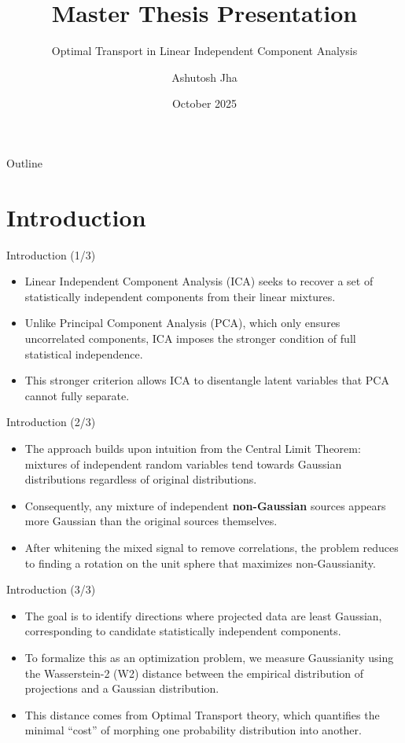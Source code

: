 \documentclass{beamer}
\title{Master Thesis Presentation}
\subtitle{Optimal Transport in Linear Independent Component Analysis}
\author{Ashutosh Jha}
\institute{University of Tuebingen}
\date{October 2025}
\begin{document}
\begin{frame}
  \titlepage
\end{frame}

\begin{frame}{Outline}
  \tableofcontents
\end{frame}

\section{Introduction}

\begin{frame}{Introduction (1/3)}
  \begin{itemize}
    \item Linear Independent Component Analysis (ICA) seeks to recover a set of statistically independent components from their linear mixtures.
    \item Unlike Principal Component Analysis (PCA), which only ensures uncorrelated components, ICA imposes the stronger condition of full statistical independence.
    \item This stronger criterion allows ICA to disentangle latent variables that PCA cannot fully separate.
  \end{itemize}
\end{frame}

\begin{frame}{Introduction (2/3)}
  \begin{itemize}
    \item The approach builds upon intuition from the Central Limit Theorem: mixtures of independent random variables tend towards Gaussian distributions regardless of original distributions.
    \item Consequently, any mixture of independent \textbf{non-Gaussian} sources appears more Gaussian than the original sources themselves.
    \item After whitening the mixed signal to remove correlations, the problem reduces to finding a rotation on the unit sphere that maximizes non-Gaussianity.
  \end{itemize}
\end{frame}

\begin{frame}{Introduction (3/3)}
  \begin{itemize}
    \item The goal is to identify directions where projected data are least Gaussian, corresponding to candidate statistically independent components.
    \item To formalize this as an optimization problem, we measure Gaussianity using the Wasserstein-2 (W2) distance between the empirical distribution of projections and a Gaussian distribution.
    \item This distance comes from Optimal Transport theory, which quantifies the minimal “cost” of morphing one probability distribution into another.
  \end{itemize}
\end{frame}
\end{document}
